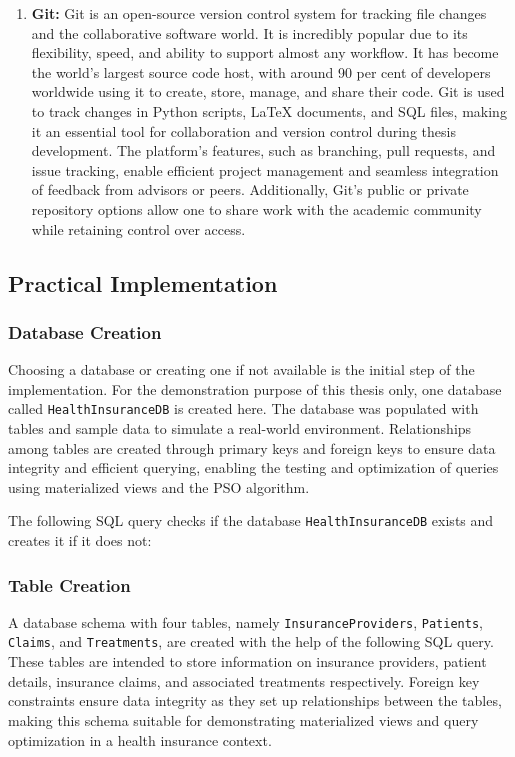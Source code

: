 \begin{enumerate}[label=(\roman*)]
\item\textbf{Git:} Git is an open-source version control system for tracking file changes and the collaborative software world. It is incredibly popular due to its flexibility, speed, and ability to support almost any workflow. It has become the world's largest source code host, with around 90 per cent of developers worldwide using it to create, store, manage, and share their code. Git is used to track changes in Python scripts, LaTeX documents, and SQL files, making it an essential tool for collaboration and version control during thesis development. The platform’s features, such as branching, pull requests, and issue tracking, enable efficient project management and seamless integration of feedback from advisors or peers. Additionally, Git’s public or private repository options allow one to share work with the academic community while retaining control over access.

\end{enumerate}

\clearpage

\subsection{Practical Implementation }

\subsubsection{Database Creation}
Choosing a database or creating one if not available is the initial step of the implementation. For the demonstration purpose of this thesis only, one database called \texttt{HealthInsuranceDB} is created here. The database was populated with tables and sample data to simulate a real-world environment. Relationships among tables are created through primary keys and foreign keys to ensure data integrity and efficient querying, enabling the testing and optimization of queries using materialized views and the PSO algorithm.

The following SQL query checks if the database \texttt{HealthInsuranceDB} exists and creates it if it does not: \vspace{.4cm}




\subsubsection{Table Creation} A database schema with four tables, namely \texttt{InsuranceProviders}, \texttt{Patients}, \texttt{Claims}, and \texttt{Treatments}, are created with the help of the following SQL query. These tables are intended to store information on insurance providers, patient details, insurance claims, and associated treatments respectively. Foreign key constraints ensure data integrity as they set up relationships between the tables, making this schema suitable for demonstrating materialized views and query optimization in a health insurance context. \vspace{.4cm}

